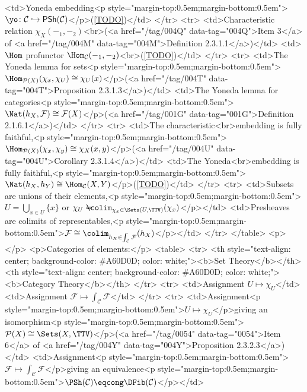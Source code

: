     <td>Yoneda embedding<p style="margin-top:0.5em;margin-bottom:0.5em">$\yo\colon\mathcal{C}\hookrightarrow\mathsf{PSh}(\mathcal{C})$</p>(\cref{TODO})</td>
  </tr>
  <tr>
    <td>Characteristic relation $\chi_{X}(-_{1},-_{2})$<br>(<a href="/tag/004Q" data-tag="004Q">Item 3</a> of <a href="/tag/004M" data-tag="004M">Definition 2.3.1.1</a>)</td>
    <td>$\Hom$ profunctor $\Hom_{\mathcal{C}}(-_{1},-_{2})$<br>(\cref{TODO})</td>
  </tr>
  <tr>
  <td>The Yoneda lemma for sets<p style="margin-top:0.5em;margin-bottom:0.5em">$\Hom_{\mathcal{P}(X)}(\chi_{x},\chi_{U})\cong\chi_{U}(x)$</p>(<a href="/tag/004T" data-tag="004T">Proposition 2.3.1.3</a>)</td>
    <td>The Yoneda lemma for categories<p style="margin-top:0.5em;margin-bottom:0.5em">$\Nat(h_{X},\mathcal{F})\cong\mathcal{F}(X)$</p>(<a href="/tag/001G" data-tag="001G">Definition 2.1.6.1</a>)</td>
  </tr>
  <tr>
    <td>The characteristic<br>embedding is fully faithful,<p style="margin-top:0.5em;margin-bottom:0.5em">$\Hom_{\mathcal{P}(X)}(\chi_{x},\chi_{y})\cong\chi_{X}(x,y)$</p>(<a href="/tag/004U" data-tag="004U">Corollary 2.3.1.4</a>)</td>
    <td>The Yoneda<br>embedding is fully faithful,<p style="margin-top:0.5em;margin-bottom:0.5em">$\Nat(h_{X},h_{Y})\cong\Hom_{\mathcal{C}}(X,Y)$</p>(\cref{TODO})</td>
  </tr>
  <tr>
    <td>Subsets are unions of their elements,<p style="margin-top:0.5em;margin-bottom:0.5em">$\displaystyle U=\bigcup_{x\in U}\{x\}$ or $\displaystyle\chi_{U}=\mkern-18mu\colim_{\chi_{x}\in\Sets(U,\TTV)}(\chi_{x})$</p></td>
    <td>Presheaves are colimits of representables,<p style="margin-top:0.5em;margin-bottom:0.5em">$\displaystyle\mathcal{F}\cong\colim_{h_{X}\in\int_{\mathcal{C}}\mathcal{F}}(h_{X})$</p></td>
  </tr>
</table>
<p></p>
<p>Categories of elements:</p>
<table>
  <tr>
    <th style="text-align: center; background-color: #A60D0D; color: white;"><b>Set Theory</b></th>
    <th style="text-align: center; background-color: #A60D0D; color: white;"><b>Category Theory</b></th>
  </tr>
  <tr>
    <td>Assignment $U\mapsto\chi_{U}$</td>
    <td>Assignment $\mathcal{F}\mapsto\int_{\mathcal{C}}\mathcal{F}$</td>
  </tr>
  <tr>
  <td>Assignment<p style="margin-top:0.5em;margin-bottom:0.5em">$U\mapsto\chi_{U}$</p>giving an isomorphism<p style="margin-top:0.5em;margin-bottom:0.5em">$\mathcal{P}(X)\cong\Sets(X,\TTV)$</p>(<a href="/tag/0054" data-tag="0054">Item 6</a> of <a href="/tag/004Y" data-tag="004Y">Proposition 2.3.2.3</a>)</td>
    <td>Assignment<p style="margin-top:0.5em;margin-bottom:0.5em">$\mathcal{F}\mapsto\int_{\mathcal{C}}\mathcal{F}$</p>giving an equivalence<p style="margin-top:0.5em;margin-bottom:0.5em">$\PSh(\mathcal{C})\eqcong\DFib(\mathcal{C})$</p></td>
